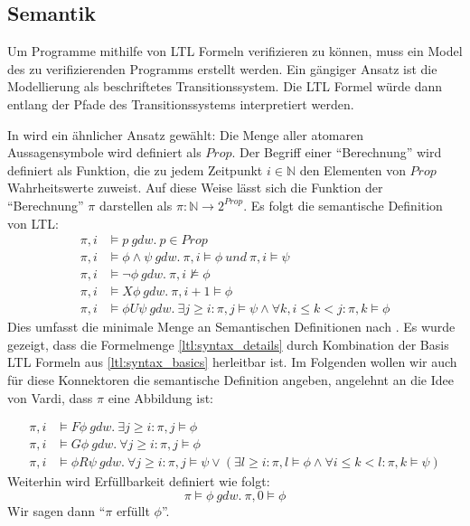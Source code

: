 \subsection{Semantik}

Um Programme mithilfe von LTL Formeln verifizieren zu können, muss ein Model des zu verifizierenden Programms erstellt werden. Ein gängiger Ansatz ist die Modellierung als beschriftetes Transitionssystem\cite{huth+04}. Die LTL Formel würde dann entlang der Pfade des Transitionssystems interpretiert werden. 

In \cite{vardi+96} wird ein ähnlicher Ansatz gewählt: Die Menge aller atomaren Aussagensymbole wird definiert als $Prop$. Der Begriff einer "`Berechnung"' wird definiert als Funktion, die zu jedem Zeitpunkt $i \in \mathbb{N}$ den Elementen von $Prop$ Wahrheitswerte zuweist. Auf diese Weise lässt sich die Funktion der "`Berechnung"' $\pi$ darstellen als $\pi : \mathbb{N} \rightarrow 2^{Prop}$. Es folgt die semantische Definition von LTL: 
\begin{equation*}
\begin{split}
    \pi, i &\models p\ gdw.\ p \in Prop\\
    \pi, i &\models \phi \land \psi\ gdw.\ \pi, i \models \phi\ und\ \pi, i \models \psi\\
    \pi, i &\models \lnot\phi\ gdw.\ \pi, i \not\models \phi\\
    \pi, i &\models X\phi\ gdw.\ \pi, i+1 \models \phi\\
    \pi, i &\models \phi U\psi\ gdw.\ \exists j \geq i: \pi, j \models \psi \land \forall k, i\leq k<j: \pi, k \models \phi
\end{split}
\end{equation*}
Dies umfasst die minimale Menge an Semantischen Definitionen nach \cite{vardi+96}. Es wurde gezeigt, dass die Formelmenge \ref{ltl:syntax_details} durch Kombination der Basis LTL Formeln aus \ref{ltl:syntax_basics} herleitbar ist. Im Folgenden wollen wir auch für diese Konnektoren die semantische Definition angeben, angelehnt an die Idee von Vardi, dass $\pi$ eine Abbildung ist:

\begin{equation*}
\begin{split}
    \pi, i &\models F\phi\ gdw.\ \exists j \geq i: \pi, j \models \phi\\
    \pi, i &\models G\phi \ gdw.\ \forall j \geq i: \pi, j \models \phi\\
    \pi, i &\models \phi R\psi\ gdw.\ \forall j \geq i: \pi, j \models \psi \lor (\exists l \geq i: \pi, l \models \phi \land \forall i \leq k < l: \pi, k \models \psi)
\end{split}
\end{equation*}
Weiterhin wird Erfüllbarkeit definiert wie folgt: 
\[
    \pi \models \phi\ gdw.\ \pi, 0 \models \phi
\]
Wir sagen dann "`$\pi$ erfüllt $\phi$"'.

